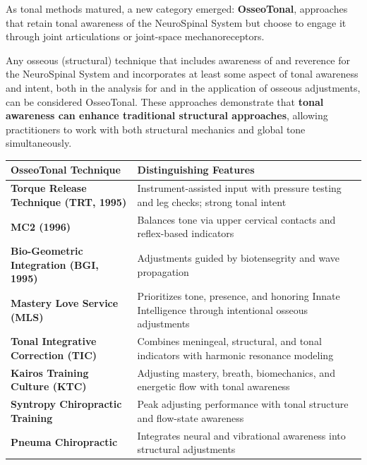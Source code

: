 \documentclass[11pt,letterpaper]{article}
\begin{document}
As tonal methods matured, a new category emerged: \textbf{OsseoTonal}, approaches that retain tonal awareness of the NeuroSpinal System but choose to engage it through joint articulations or joint-space mechanoreceptors.


Any osseous (structural) technique that includes awareness of and reverence for the NeuroSpinal System and incorporates at least some aspect of tonal awareness and intent, both in the analysis for and in the application of osseous adjustments, can be considered OsseoTonal. These approaches demonstrate that \textbf{tonal awareness can enhance traditional structural approaches}, allowing practitioners to work with both structural mechanics and global tone simultaneously.


\begin{center}
\begin{tabular}{ll}
\toprule
\rowcolor{primaryblue}
\textbf{\textsf{\color{white}OsseoTonal Technique}} & \textbf{\textsf{\color{white}Distinguishing Features}} \\
\midrule
\rowcolor{lightbluebg!40}
\textbf{Torque Release Technique (TRT, 1995)} & Instrument-assisted input with pressure testing and leg checks; strong tonal intent \\
\textbf{MC2 (1996)} & Balances tone via upper cervical contacts and reflex-based indicators \\
\rowcolor{lightbluebg!40}
\textbf{Bio-Geometric Integration (BGI, 1995)} & Adjustments guided by biotensegrity and wave propagation \\
\textbf{Mastery Love Service (MLS)} & Prioritizes tone, presence, and honoring Innate Intelligence through intentional osseous adjustments \\
\rowcolor{lightbluebg!40}
\textbf{Tonal Integrative Correction (TIC)} & Combines meningeal, structural, and tonal indicators with harmonic resonance modeling \\
\textbf{Kairos Training Culture (KTC)} & Adjusting mastery, breath, biomechanics, and energetic flow with tonal awareness \\
\rowcolor{lightbluebg!40}
\textbf{Syntropy Chiropractic Training} & Peak adjusting performance with tonal structure and flow-state awareness \\
\textbf{Pneuma Chiropractic} & Integrates neural and vibrational awareness into structural adjustments \\
\bottomrule
\end{tabular}
\end{center}
\end{document}
